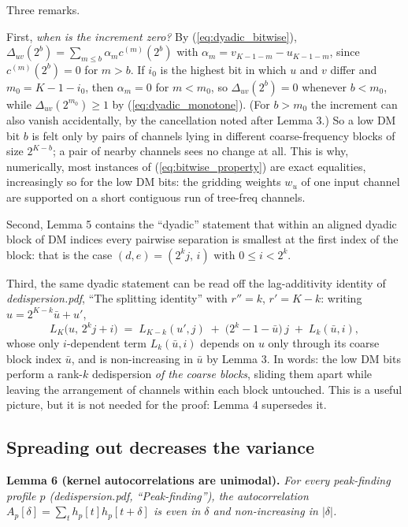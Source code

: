 \documentclass{article}
\numberwithin{equation}{section}   %
\newcommand{\ddnotes}[1]{{\em dedispersion.pdf}, ``#1''}
\begin{document}
\medskip
\par\noindent
Three remarks.

First, {\em when is the increment zero?} By (\ref{eq:dyadic_bitwise}),
$\Delta_{uv}(2^b) = \sum_{m \le b} \alpha_m c^{(m)}(2^b)$ with
$\alpha_m = v_{K-1-m}-u_{K-1-m}$, since $c^{(m)}(2^b) = 0$ for $m > b$. If $i_0$ is the
highest bit in which $u$ and $v$ differ and $m_0 = K-1-i_0$, then $\alpha_m = 0$ for $m<m_0$,
so $\Delta_{uv}(2^b) = 0$ whenever $b < m_0$, while $\Delta_{uv}(2^{m_0}) \ge 1$ by
(\ref{eq:dyadic_monotone}). (For $b > m_0$ the increment can also vanish accidentally, by the
cancellation noted after Lemma 3.) So a low DM bit $b$ is felt only by pairs of channels lying
in different coarse-frequency blocks of size $2^{K-b}$; a pair of nearby channels sees no
change at all. This is why, numerically, most instances of (\ref{eq:bitwise_property}) are
exact equalities, increasingly so for the low DM bits: the gridding weights $w_u$ of one input
channel are supported on a short contiguous run of tree-freq channels.

Second, Lemma 5 contains the ``dyadic'' statement that within an aligned dyadic block of DM
indices every pairwise separation is smallest at the first index of the block: that is the
case $(d,e) = (2^kj,\, i)$ with $0 \le i < 2^k$.

Third, the same dyadic statement can be read off the lag-additivity identity of
\ddnotes{The splitting identity} with $r''=k$, $r'=K-k$: writing $u = 2^{K-k}\bar u + u'$,
\begin{equation}
L_K\big(u,\, 2^k j + i\big) \;=\; L_{K-k}(u', j) \;+\; \big(2^k - 1 - \bar u\big) \, j
   \;+\; L_k(\bar u, i),
\label{eq:dyadic_split}
\end{equation}
whose only $i$-dependent term $L_k(\bar u, i)$ depends on $u$ only through its coarse block
index $\bar u$, and is non-increasing in $\bar u$ by Lemma 3. In words: the low DM bits
perform a rank-$k$ dedispersion {\em of the coarse blocks}, sliding them apart while leaving
the arrangement of channels within each block untouched. This is a useful picture, but it is
not needed for the proof: Lemma 4 supersedes it.

\subsection{Spreading out decreases the variance}
\label{ssec:dyadic_kernel}

\par\noindent
{\bf Lemma 6 (kernel autocorrelations are unimodal).}
{\em For every peak-finding profile $p$ (\ddnotes{Peak-finding}), the autocorrelation
$A_p[\delta] = \sum_t h_p[t] h_p[t+\delta]$ is even in $\delta$ and non-increasing in
$|\delta|$.}
\end{document}

